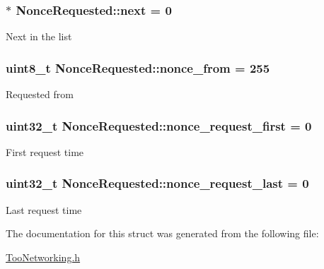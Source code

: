 \subsubsection[{\texorpdfstring{next}{next}}]{$\ast$ Nonce\+Requested\+::next = 0}\hypertarget{structNonceRequested_a2ef35667b6b2cb12f1c845ddc63f16ec}{}\label{structNonceRequested_a2ef35667b6b2cb12f1c845ddc63f16ec}
Next in the list 
\subsubsection[{\texorpdfstring{nonce\+\_\+from}{nonce_from}}]{\setlength{\rightskip}{0pt plus 5cm}uint8\+\_\+t Nonce\+Requested\+::nonce\+\_\+from = 255}\hypertarget{structNonceRequested_a49d5f4e83fa72e51cc37237cc46f3a7e}{}\label{structNonceRequested_a49d5f4e83fa72e51cc37237cc46f3a7e}
Requested from 
\subsubsection[{\texorpdfstring{nonce\+\_\+request\+\_\+first}{nonce_request_first}}]{\setlength{\rightskip}{0pt plus 5cm}uint32\+\_\+t Nonce\+Requested\+::nonce\+\_\+request\+\_\+first = 0}\hypertarget{structNonceRequested_a9e2f47eec20e01c7cce1acf2d47bbf14}{}\label{structNonceRequested_a9e2f47eec20e01c7cce1acf2d47bbf14}
First request time 
\subsubsection[{\texorpdfstring{nonce\+\_\+request\+\_\+last}{nonce_request_last}}]{\setlength{\rightskip}{0pt plus 5cm}uint32\+\_\+t Nonce\+Requested\+::nonce\+\_\+request\+\_\+last = 0}\hypertarget{structNonceRequested_ae5453d115c1ba4044592921e0127f0c8}{}\label{structNonceRequested_ae5453d115c1ba4044592921e0127f0c8}
Last request time 

The documentation for this struct was generated from the following file\+:\begin{DoxyCompactItemize}
\item 
\hyperlink{TooNetworking_8h}{Too\+Networking.\+h}\end{DoxyCompactItemize}
